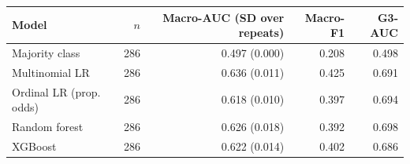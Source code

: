 \begin{tabular}{lrrrr}
\toprule
Model & $n$ & Macro-AUC (SD over repeats) & Macro-F1 & G3-AUC \\
\midrule
Majority class & 286 & 0.497 (0.000) & 0.208 & 0.498 \\
Multinomial LR & 286 & 0.636 (0.011) & 0.425 & 0.691 \\
Ordinal LR (prop. odds) & 286 & 0.618 (0.010) & 0.397 & 0.694 \\
Random forest & 286 & 0.626 (0.018) & 0.392 & 0.698 \\
XGBoost & 286 & 0.622 (0.014) & 0.402 & 0.686 \\
\bottomrule
\end{tabular}